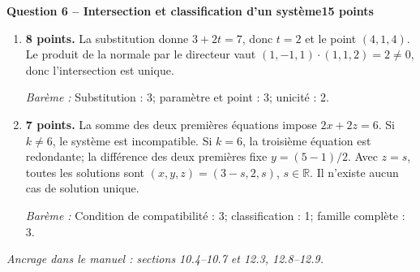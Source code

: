 \documentclass[11pt,a4paper]{article}
\begin{document}
\newpage
{\large\bfseries Question 6 -- Intersection et classification d’un système}\hfill\textbf{15 points}\par
\begin{enumerate}
\item \textbf{8 points.} La substitution donne \(3+2t=7\), donc \(t=2\) et le point \((4,1,4)\). Le produit de la normale par le directeur vaut \((1,-1,1)\cdot(1,1,2)=2\ne0\), donc l’intersection est unique.
\par{\small\textit{Barème : }Substitution : 3; paramètre et point : 3; unicité : 2.}
\item \textbf{7 points.} La somme des deux premières équations impose \(2x+2z=6\). Si \(k\ne6\), le système est incompatible. Si \(k=6\), la troisième équation est redondante; la différence des deux premières fixe \(y=(5-1)/2\). Avec \(z=s\), toutes les solutions sont \((x,y,z)=(3-s,2,s)\), \(s\in\mathbb R\). Il n’existe aucun cas de solution unique.
\par{\small\textit{Barème : }Condition de compatibilité : 3; classification : 1; famille complète : 3.}
\end{enumerate}
\vfill {\small\textit{Ancrage dans le manuel : sections 10.4--10.7 et 12.3, 12.8--12.9.}}
\end{document}
